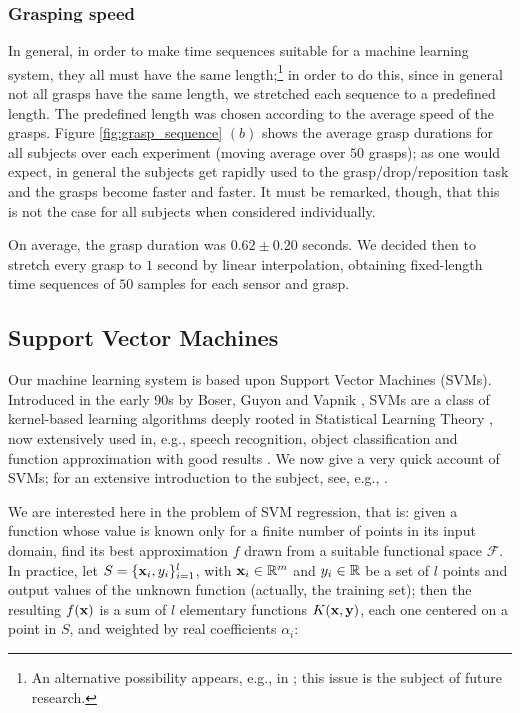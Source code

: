 \subsubsection*{Grasping speed}

In general, in order to make time sequences suitable for a machine
learning system, they all must have the same length;\footnote{An
alternative possibility appears, e.g., in
\cite{shimodaira02dynamic}; this issue is the subject of future
research.} in order to do this, since in general not all grasps have
the same length, we stretched each sequence to a predefined
length. The predefined length was chosen according to the average
speed of the grasps. Figure \ref{fig:grasp_sequence} $(b)$ shows the
average grasp durations for all subjects over each experiment (moving
average over $50$ grasps); as one would expect, in general the
subjects get rapidly used to the grasp/drop/reposition task and the
grasps become faster and faster. It must be remarked, though, that
this is not the case for all subjects when considered individually.

On average, the grasp duration was $0.62 \pm 0.20$ seconds. We decided
then to stretch every grasp to $1$ second by linear interpolation,
obtaining fixed-length time sequences of $50$ samples for each sensor
and grasp.

\subsection{Support Vector Machines}

Our machine learning system is based upon Support Vector Machines
(SVMs). Introduced in the early 90s by Boser, Guyon and Vapnik
\cite{BGV92}, SVMs are a class of kernel-based learning algorithms
deeply rooted in Statistical Learning Theory \cite{v-edbed-82}, now
extensively used in, e.g., speech recognition, object classification
and function approximation with good results \cite{Cristianini00}. We
now give a very quick account of SVMs; for an extensive introduction
to the subject, see, e.g., \cite{SmolaTut2004}.

We are interested here in the problem of SVM regression, that is:
given a function whose value is known only for a finite number of
points in its input domain, find its best approximation $f$ drawn from
a suitable functional space $\mathcal{F}$. In practice, let
$S=\{\mathbf{x}_i,y_i\}_{i=1}^l$, with $\mathbf{x}_i \in \mathbb{R}^m$ and $y_i \in \mathbb{R}$ be
a set of $l$ points and output values of the unknown function
(actually, the training set); then the resulting $f(\mathbf{x})$ is a sum of
$l$ elementary functions $K(\mathbf{x},\mathbf{y})$, each one centered on a point in
$S$, and weighted by real coefficients $\alpha_i$:

